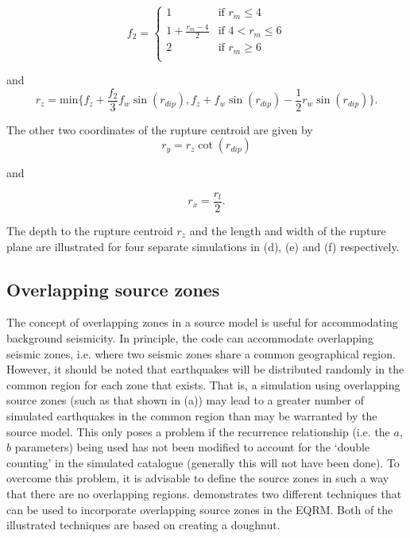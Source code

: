 \begin{equation}
f_2 = \left \{ \begin{array}{ll} 1 & \textrm{if $r_m\leq4$} \\
1 + \frac{r_m-4}{2} & \textrm{if $4<r_m\leq6$} \\
2 & \textrm{if $r_m\geq6$} \\
\end{array} \right.
\end{equation}

and
\begin{equation}
r_z = \textrm{min$\{f_z+\frac{f_2}{3}f_w\sin(r_{dip}),
f_z+f_w\sin(r_{dip})-\frac{1}{2}r_w\sin(r_{dip})\}$}.
\end{equation}

The other two coordinates of the rupture centroid are given by
\begin{equation}
r_y = r_z\cot(r_{dip})
\end{equation}

and

\begin{equation}
r_x = \frac{r_l}{2}.
\end{equation}


The depth to the rupture centroid $r_z$ and the length and width
of the rupture plane are illustrated for four separate simulations
in
(d),
(e) and (f) respectively.

\subsection{Overlapping source zones}

The concept of overlapping zones in a source model is useful for
accommodating background seismicity. In principle, the code can
accommodate overlapping seismic zones, i.e. where two seismic
zones share a common geographical region. However, it should be
noted that earthquakes will be distributed randomly in the common
region for each zone that exists. That is, a simulation using
overlapping source zones (such as that shown in
(a)) may lead to a greater number
of simulated earthquakes in the common
region than may be warranted by the source model. This only poses
a problem if the recurrence relationship (i.e. the $a$, $b$
parameters) being used has not been modified to account for the
`double counting' in the simulated catalogue (generally this will
not have been done). To overcome this problem, it is advisable to
define the source zones in such a way that there are no
overlapping regions.  demonstrates
two different techniques that can be used to incorporate
overlapping source zones in the EQRM. Both of the illustrated
techniques are based on creating a doughnut.

